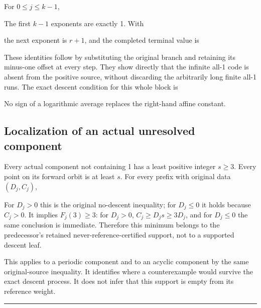 
For \(0\le j\le k-1\),


The first \(k-1\) exponents are exactly 1. With


the next exponent is \(r+1\), and the completed terminal value is


These identities follow by substituting the original branch and
retaining its minus-one offset at every step. They show directly that
the infinite all-1 code is absent from the positive source, without
discarding the arbitrarily long finite all-1 runs. The exact descent
condition for this whole block is


No sign of a logarithmic average replaces the right-hand affine
constant.

\subsection{Localization of an actual unresolved component}

Every actual component not containing 1 has a least positive integer
\(s\ge3\). Every point on its forward orbit is at least \(s\). For every
prefix with original data \((D_j,C_j)\),


For \(D_j>0\) this is the original no-descent inequality; for
\(D_j\le0\) it holds because \(C_j>0\). It implies \(F_j(3)\ge3\): for
\(D_j>0\), \(C_j\ge D_js\ge3D_j\), and for \(D_j\le0\) the same
conclusion is immediate. Therefore this minimum belongs to the
predecessor's retained never-reference-certified support, not to a
supported descent leaf.

This applies to a periodic component and to an acyclic component by the
same original-source inequality. It identifies where a counterexample
would survive the exact descent process. It does not infer that this
support is empty from its reference weight.

\begin{center}\rule{0.5\linewidth}{0.5pt}\end{center}

